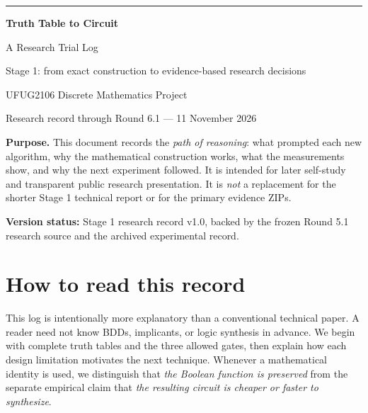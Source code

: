 \documentclass[a4paper,10pt]{article}
\theoremstyle{definition}
\theoremstyle{remark}
\begin{document}
\begin{titlepage}
\thispagestyle{empty}
\vspace*{1.8cm}
{\noindent\sffamily\color{ResearchBlue}\rule{\textwidth}{4pt}}\par
\vspace{1.15cm}
{\Huge\bfseries Truth Table to Circuit}\par\vspace{0.3cm}
{\LARGE A Research Trial Log\par}
\vspace{.5cm}
{\large Stage 1: from exact construction to evidence-based research decisions\par}
\vspace{1cm}
{\large UFUG2106 Discrete Mathematics Project\par}
\vspace{0.45cm}
{\large Research record through Round 6.1 --- 11 November 2026\par}
\vfill
\begin{tcolorbox}[colback=ResearchIvory,colframe=ResearchSlate,arc=2mm]
\textbf{Purpose.} This document records the \emph{path of reasoning}: what prompted each new algorithm, why the mathematical construction works, what the measurements show, and why the next experiment followed. It is intended for later self-study and transparent public research presentation. It is \emph{not} a replacement for the shorter Stage 1 technical report or for the primary evidence ZIPs.
\end{tcolorbox}
\vfill
\textbf{Version status:} Stage 1 research record v1.0, backed by the frozen Round 5.1 research source and the archived experimental record.\par
\end{titlepage}
\setcounter{tocdepth}{1}
\tableofcontents
\clearpage

\section{How to read this record}
This log is intentionally more explanatory than a conventional technical paper. A reader need not know BDDs, implicants, or logic synthesis in advance. We begin with complete truth tables and the three allowed gates, then explain how each design limitation motivates the next technique. Whenever a mathematical identity is used, we distinguish that \emph{the Boolean function is preserved} from the separate empirical claim that \emph{the resulting circuit is cheaper or faster to synthesize}.
\end{document}

